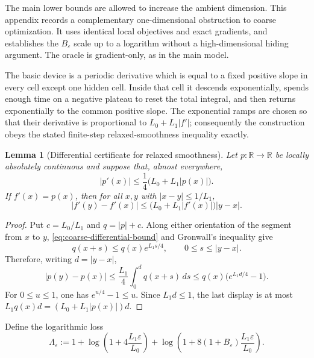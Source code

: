 \documentclass[11pt,a4paper]{article}
\newcommand{\R}{\mathbb{R}}
\newcommand{\eps}{\varepsilon}
\newtheorem{lemma}[theorem]{Lemma}
\theoremstyle{remark}
\begin{document}
The main lower bounds are allowed to increase the ambient dimension. This
appendix records a complementary one-dimensional obstruction to coarse
optimization. It uses identical local objectives and exact gradients, and
establishes the $B_\eps$ scale up to a logarithm without a high-dimensional
hiding argument. The oracle is gradient-only, as in the main model.

The basic device is a periodic derivative which is equal to a fixed positive
slope in every cell except one hidden cell.  Inside that cell it descends
exponentially, spends enough time on a negative plateau to reset the total
integral, and then returns exponentially to the common positive slope.  The
exponential ramps are chosen so that their derivative is proportional to
$L_0+L_1|f'|$; consequently the construction obeys the stated finite-step
relaxed-smoothness inequality exactly.

\begin{lemma}[Differential certificate for relaxed smoothness]
\label{lem:coarse-differential-certificate}
Let $p:\R\to\R$ be locally absolutely continuous and suppose that, almost
everywhere,
\begin{equation}
 |p'(x)|\le \frac14\bigl(L_0+L_1|p(x)|\bigr).
 \label{eq:coarse-differential-bound}
\end{equation}
If $f'(x)=p(x)$, then for all $x,y$ with $|x-y|\le1/L_1$,
\begin{equation}
 |f'(y)-f'(x)|
 \le \bigl(L_0+L_1|f'(x)|\bigr)|y-x|.
 \label{eq:coarse-exact-relaxed}
\end{equation}
\end{lemma}

\begin{proof}
Put $c=L_0/L_1$ and $q=|p|+c$.  Along either orientation of the segment from
$x$ to $y$, \eqref{eq:coarse-differential-bound} and Gronwall's inequality
give
\[
 q(x+s)\le q(x)e^{L_1s/4},
 \qquad 0\le s\le |y-x|.
\]
Therefore, writing $d=|y-x|$,
\[
 |p(y)-p(x)|
 \le \frac{L_1}{4}\int_0^d q(x+s)\,ds
 \le q(x)\bigl(e^{L_1d/4}-1\bigr).
\]
For $0\le u\le1$, one has $e^{u/4}-1\le u$.  Since $L_1d\le1$, the last
display is at most
$L_1q(x)d=(L_0+L_1|p(x)|)d$.
\end{proof}

Define the logarithmic loss
\begin{equation}
 \Lambda_\eps
 :=1+\log\left(1+4\frac{L_1\eps}{L_0}\right)
      +\log\left(1+8(1+B_\eps)\frac{L_1\eps}{L_0}\right).
 \label{eq:coarse-log-loss}
\end{equation}
\end{document}
